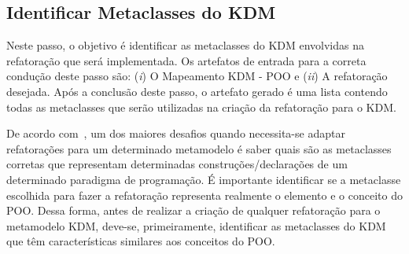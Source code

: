 \subsection{Identificar Metaclasses do KDM}\label{sec:mapeamento_POO_e_KDM}

Neste passo, o objetivo é identificar as metaclasses do KDM envolvidas na refatoração que será implementada. Os artefatos de entrada para a correta condução deste passo são: (\textit{i}) O Mapeamento KDM - POO e (\textit{ii}) A refatoração desejada. Após a conclusão deste passo, o artefato gerado é uma lista contendo todas as metaclasses que serão utilizadas na criação da refatoração para o KDM.

De acordo com~, um dos maiores desafios quando necessita-se adaptar refatorações para um determinado metamodelo é saber quais são as metaclasses corretas que representam determinadas construções/declarações de um determinado paradigma de programação. É importante identificar se a metaclasse escolhida para fazer a refatoração representa realmente o elemento e o conceito do POO. Dessa forma, antes de realizar a criação de qualquer refatoração para o metamodelo KDM, deve-se, primeiramente, identificar as metaclasses do KDM que têm características similares aos conceitos do POO. 

